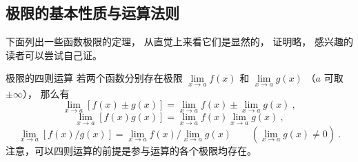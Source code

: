 
\subsection{极限的基本性质与运算法则}
下面列出一些函数极限的定理， 从直觉上来看它们是显然的， 证明略， 感兴趣的读者可以尝试自己证。
\begin{theorem}{极限的四则运算}\label{the_LimOp_1}
若两个函数分别存在极限 $\lim\limits_{x\to a} f(x)$ 和 $\lim\limits_{x\to a} g(x)$ （$a$ 可取 $\pm \infty$）， 那么有
\begin{equation}
\lim_{x\to a} [f(x) \pm g(x)] = \lim_{x\to a}f(x) \pm  \lim_{x\to a} g(x)~,
\end{equation}
\begin{equation}
\lim_{x\to a} [f(x) g(x)] = \lim_{x\to a}f(x) \lim_{x\to a} g(x)~,
\end{equation}
\begin{equation}
\lim_{x\to a} [f(x)/g(x)] = \lim_{x\to a}f(x)/\lim_{x\to a} g(x) \qquad (\lim_{x\to a} g(x) \ne 0)~.
\end{equation}
注意，可以四则运算的前提是参与运算的各个极限均存在。
\end{theorem}

